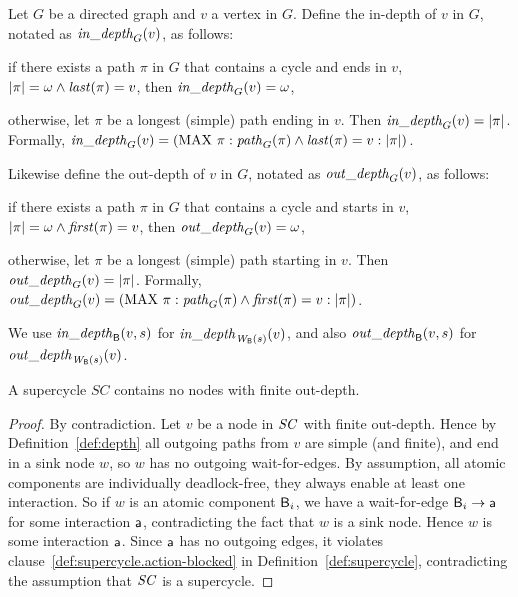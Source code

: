 \begin{definition} \label{def:depth} \label{defn:depth} 
Let $G$ be a directed graph and $v$ a vertex in $G$. Define the in-depth of $v$ in $G$, notated as
$\mathit{in\_depth}_{G}({v})$, as follows:
\be
\item if there exists a path $\pi$ in $G$ that contains a cycle and ends in $v$, \ie $|\pi| = \omega
  \land \mathit{last}(\pi) = v$, then $\mathit{in\_depth}_{G}({v}) = \omega$,

\item otherwise, let $\pi$ be a longest (simple) path ending in $v$. Then $\mathit{in\_depth}_{G}({v}) = |\pi|$.
\ee
Formally, $\mathit{in\_depth}_{G}({v}) = (\mathrm{MAX}\ \pi : \mathit{path}_{G}(\pi) \land \mathit{last}(\pi) = v : |\pi|)$.

Likewise define the out-depth of $v$ in $G$, notated as
$\mathit{out\_depth}_{G}({v})$, as follows:
\be
\item if there exists a path $\pi$ in $G$ that contains a cycle and starts in $v$, \ie $|\pi| = \omega
  \land \mathit{first}(\pi) = v$, then $\mathit{out\_depth}_{G}({v}) = \omega$,

\item otherwise, let $\pi$ be a longest (simple) path starting in $v$. Then $\mathit{out\_depth}_{G}({v}) = |\pi|$.
\ee
Formally, $\mathit{out\_depth}_{G}({v}) = (\mathrm{MAX}\ \pi : \mathit{path}_{G}(\pi) \land \mathit{first}(\pi) = v : |\pi|)$.
\end{definition}

\noindent
We use $\mathit{in\_depth}_{\mathsf{B}}({v, s})$ for $\mathit{in\_depth}_{\mathit{W}_{\mathsf{B}}({s})}({v})$, and also
$\mathit{out\_depth}_{\mathsf{B}}({v, s})$ for $\mathit{out\_depth}_{\mathit{W}_{\mathsf{B}}({s})}({v})$.



\begin{proposition} \label{prop:supercycle:no-finite-outdegree}
\label{prop:supercycle:no-finite-outdepth} A supercycle $SC$
contains no nodes with finite out-depth.
\end{proposition}
%
%
\begin{proof} By contradiction. Let $v$ be a node in $\mathit{SC}$ with finite out-depth.
Hence by Definition~\ref{def:depth}  all outgoing paths from $v$ are
simple (and finite), and end in a
sink node $w$, so $w$ has no outgoing wait-for-edges.
By assumption, all atomic components are individually
deadlock-free, \ie they always enable at least one interaction. So if
$w$ is an atomic component $\mathsf{B}_i$, we have a wait-for-edge $\mathsf{B}_i \rightarrow \mathsf{a}$
for some interaction $\mathsf{a}$, contradicting the fact that $w$ is a sink node.
Hence $w$ is some interaction $\mathsf{a}$.
Since $\mathsf{a}$ has no outgoing edges, it violates
clause~\ref{def:supercycle.action-blocked} in
Definition~\ref{def:supercycle}, contradicting the assumption that
$\mathit{SC}$ is a supercycle.
\end{proof}
